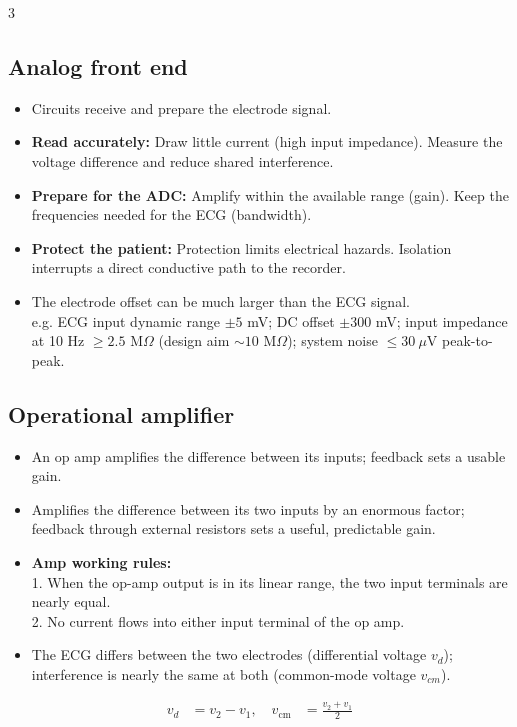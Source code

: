 \documentclass[10pt,a4paper]{ctexart}
\newcommand{\key}[1]{\textbf{#1}}
\newcommand{\formula}[1]{%
  \par\vspace{1pt}%
  \begingroup
  \setlength{\abovedisplayskip}{0pt}%
  \setlength{\belowdisplayskip}{0pt}%
  \[
    #1
  \]
  \endgroup
  \vspace{1pt}%
}
\begin{document}
\begin{multicols*}{3}
\subsection{Analog front end}
\begin{itemize}
  \item Circuits receive and prepare the electrode signal.
  \item \key{Read accurately:} Draw little current (high input impedance). 
  Measure the voltage difference and reduce shared interference.
  \item \key{Prepare for the ADC:} Amplify within the available range (gain).
  Keep the frequencies needed for the ECG (bandwidth).
  \item \key{Protect the patient:} Protection limits electrical hazards.
  Isolation interrupts a direct conductive path to the recorder.
  \item The electrode offset can be much larger than the ECG signal. \\
  e.g. ECG input dynamic range $\pm5$ mV; DC offset
  $\pm300$ mV; input impedance at 10 Hz $\ge2.5$ M$\Omega$ (design aim
  $\sim10$ M$\Omega$); system noise $\le30~\mu$V peak-to-peak.
\end{itemize}

\subsection{Operational amplifier}
\begin{itemize}
  \item An op amp amplifies the difference between its inputs; feedback sets a usable gain.
  \item Amplifies the difference between its two inputs by an enormous factor; 
  feedback through external resistors sets a useful, predictable gain.
  \item \key{Amp working rules:} \\
  1. When the op-amp output is in its linear range, the two input terminals are nearly equal.\\
  2. No current flows into either input terminal of the op amp.
  \item The ECG differs between the two electrodes (differential voltage $v_d$); 
  interference is nearly the same at both (common-mode voltage $v_{cm}$).
\end{itemize}

\formula{\displaystyle
  \begin{aligned}
    v_d&=v_2-v_1, \quad  v_\mathrm{cm}&=\frac{v_2+v_1}{2}
  \end{aligned}}


\end{multicols*}
\end{document}
